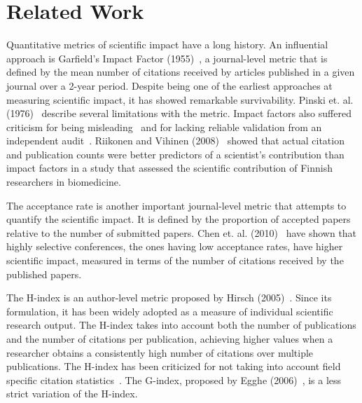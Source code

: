 \documentclass[man]{apa6}
\begin{document}
\section{Related Work}\label{sec:related-work}

Quantitative metrics of scientific impact have a long history. An influential approach is
Garfield's Impact Factor (1955)~\cite{Garfield1955a}, a journal-level metric that is defined
by the mean number of citations received by articles published in a given journal over a 2-year period. 
Despite being one of the earliest approaches at measuring scientific impact, it has showed remarkable 
survivability. 
Pinski et. al. (1976)~\cite{Pinski1976} describe several limitations with the metric. Impact factors also suffered 
criticism for being misleading~\cite{Nature2016, Saha2003} and for lacking reliable validation from an independent 
audit~\cite{Rossner2007}. Riikonen and Vihinen (2008)~\cite{Riikonen2008} showed that actual citation 
and publication counts were better predictors of a scientist's contribution than impact factors in a 
study that assessed the scientific contribution of Finnish researchers in biomedicine.

The acceptance rate is another important journal-level metric that attempts to quantify the scientific impact. It
is defined by the proportion of accepted papers relative to the number of submitted papers. Chen et. al. (2010)~\cite{Chen2010} 
have shown that highly selective conferences, the ones having low acceptance rates, have higher 
scientific impact, measured in terms of the number of citations received by the published papers.

The H-index is an author-level metric proposed by Hirsch (2005)~\cite{Hirsch2005}. Since its formulation, it has been 
widely adopted as a measure of individual scientific research output.
The H-index takes into account both the number of publications and the number of citations per publication, 
achieving higher values when a researcher obtains a consistently high number of citations over multiple publications. 
The H-index has been criticized for not taking into account field specific citation
statistics~\cite{Wendl2007}. The G-index, proposed by Egghe (2006)~\cite{Egghe2006}, is a less strict variation 
of the H-index.
\end{document}
